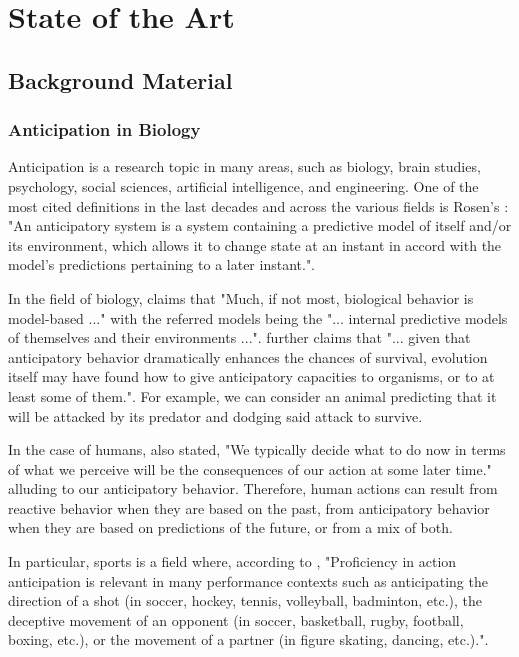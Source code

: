 \chapter{State of the Art}
\label{chapter:state_of_the_art}

\section{Background Material}

\subsection{Anticipation in Biology}

Anticipation is a research topic in many areas, such as biology, brain studies, psychology, social sciences, artificial intelligence, and engineering. One of the most cited definitions in the last decades and across the various fields is Rosen's \cite{Rosen1985}: "An anticipatory system is a system containing a predictive model of itself and/or its environment, which allows it to change state at an instant in accord with the model's predictions pertaining to a later instant.".

In the field of biology, \textcite{Louie2010} claims that "Much, if not most, biological behavior is model-based ..." with the referred models being the "... internal predictive models of themselves and their environments ...". \textcite{Poli2010} further claims that "... given that anticipatory behavior dramatically enhances the chances of survival, evolution itself may have found how to give anticipatory capacities to organisms, or to at least some of them.". For example, we can consider an animal predicting that it will be attacked by its predator and dodging said attack to survive.

In the case of humans, \textcite{Louie2010} also stated, "We typically decide what to do now in terms of what we perceive will be the consequences of our action at some later time." alluding to our anticipatory behavior. Therefore, human actions can result from reactive behavior when they are based on the past, from anticipatory behavior when they are based on predictions of the future, or from a mix of both.

In particular, sports is a field where, according to \textcite{Smith2016}, "Proficiency in action anticipation is relevant in many performance contexts such as anticipating the direction of a shot (in soccer, hockey, tennis, volleyball, badminton, etc.), the deceptive movement of an opponent (in soccer, basketball, rugby, football, boxing, etc.), or the movement of a partner (in figure skating, dancing, etc.).".

